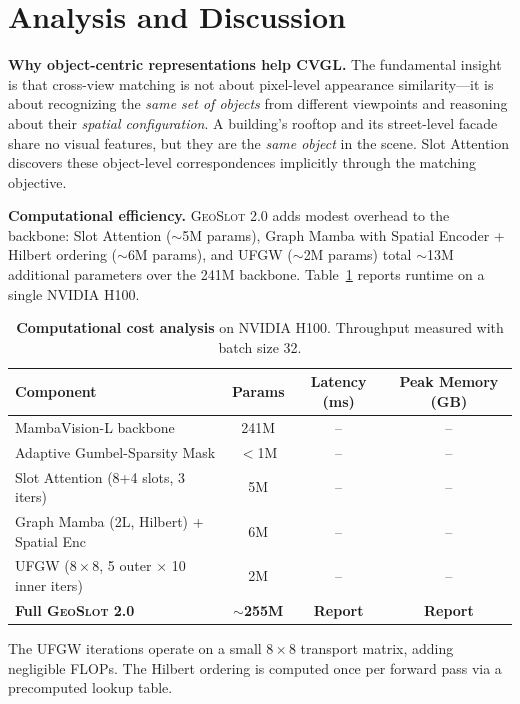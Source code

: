 \documentclass{article}
\newcommand{\oursv}{\textsc{GeoSlot 2.0}}
\begin{document}
\section{Analysis and Discussion}\label{sec:analysis}

\textbf{Why object-centric representations help CVGL.}
The fundamental insight is that cross-view matching is not about pixel-level appearance similarity—it is about recognizing the \textit{same set of objects} from different viewpoints and reasoning about their \textit{spatial configuration}. A building's rooftop and its street-level facade share no visual features, but they are the \textit{same object} in the scene. Slot Attention discovers these object-level correspondences implicitly through the matching objective.

\textbf{Computational efficiency.}
\oursv{} adds modest overhead to the backbone: Slot Attention ($\sim$5M params), Graph Mamba with Spatial Encoder + Hilbert ordering ($\sim$6M params), and UFGW ($\sim$2M params) total $\sim$13M additional parameters over the 241M backbone. Table~\ref{tab:compute} reports runtime on a single NVIDIA H100.

\begin{table}[h]
\centering
\caption{\textbf{Computational cost analysis} on NVIDIA H100. Throughput measured with batch size 32.}
\label{tab:compute}
\begin{tabular}{lccc}
\toprule
Component & Params & Latency (ms) & Peak Memory (GB) \\
\midrule
MambaVision-L backbone & 241M & -- & -- \\
Adaptive Gumbel-Sparsity Mask & $<$1M & -- & -- \\
Slot Attention (8+4 slots, 3 iters) & 5M & -- & -- \\
Graph Mamba (2L, Hilbert) + Spatial Enc & 6M & -- & -- \\
UFGW ($8{\times}8$, 5 outer $\times$ 10 inner iters) & 2M & -- & -- \\
\midrule
\textbf{Full \oursv{}} & \textbf{$\sim$255M} & \textbf{Report} & \textbf{Report} \\
\bottomrule
\end{tabular}
\end{table}
The UFGW iterations operate on a small $8 \times 8$ transport matrix, adding negligible FLOPs. The Hilbert ordering is computed once per forward pass via a precomputed lookup table.
\end{document}
